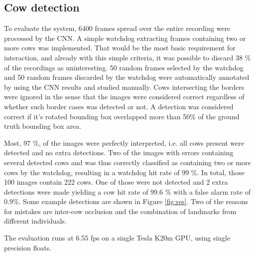 \documentclass{IET}
\begin{document}
\subsection{Cow detection}
\label{sec:num}
To evaluate the system, 6400 frames spread over the entire recording were processed by the CNN. A simple watchdog extracting frames containing two or more cows was implemented. That would be the most basic requirement for interaction, and already with this simple criteria, it was possible to discard 38 \% of the recordings as uninteresting. 50 random frames selected by the watchdog and 50 random frames discarded by the watchdog were automatically annotated by using the CNN results and studied manually. Cows intersecting the borders were ignored in the sense that the images were considered correct regardless of whether such border cases was detected or not. A detection was considered correct if it's rotated bounding box overlapped more than 50\% of the ground truth bounding box area.

Most, 97 \%, of the images were perfectly interpreted, i.e. all cows present were detected and no extra detections. Two of the images with errors containing several detected cows and was thus correctly classified as containing two or more cows by the watchdog, resulting in a watchdog hit rate of 99 \%. In total, those 100 images contain 222 cows. One of those were not detected and 2 extra detections were made yielding a cow hit rate of 99.6 \% with a false alarm rate of 0.9\%. Some example detections are shown in Figure \ref{fig:res}.
Two of the reasons for mistakes are inter-cow occlusion and the combination of landmarks from different individuals.

The evaluation runs at 6.55 fps on a single Tesla K20m GPU, using single precision floats.
\end{document}
